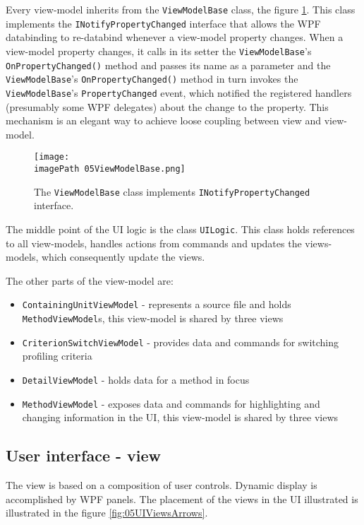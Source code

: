 Every view-model inherits from the \texttt{ViewModelBase} class, the figure \ref{fig:05ViewModelBase}. This class implements the \texttt{INotifyPropertyChanged} interface that allows the WPF databinding to re-databind whenever a view-model property changes. When a view-model property changes, it calls in its setter the \texttt{ViewModelBase}'s \texttt{OnPropertyChanged()} method and passes its name as a parameter and the \texttt{ViewModelBase}'s \texttt{OnPropertyChanged()} method in turn invokes the \texttt{ViewModelBase}'s \texttt{PropertyChanged} event, which notified the registered handlers (presumably some WPF delegates) about the change to the property. This mechanism is an elegant way to achieve loose coupling between view and view-model.
 
 \begin{figure}
	\centering
		\texttt{[image: \\imagePath 05ViewModelBase.png]}
		\caption{The \texttt{ViewModelBase} class implements \texttt{INotifyPropertyChanged} interface.}
	\label{fig:05ViewModelBase}
\end{figure}

The middle point of the UI logic is the class \texttt{UILogic}. This class holds references to all view-models, handles actions from commands and updates the views-models, which consequently update the views.

The other parts of the view-model are:
\begin{itemize}	
\item  \texttt{ContainingUnitViewModel} - represents a source file and holds \texttt{MethodViewModel}s, this view-model is shared by three views	

\item \texttt{CriterionSwitchViewModel} - provides data and commands for switching profiling criteria

\item \texttt{DetailViewModel} - holds data for a method in focus

\item \texttt{MethodViewModel} - exposes data and commands for highlighting and changing information in the UI, this view-model is shared by three views	
\end{itemize}


\subsection{User interface - view}
The view is based on a composition of user controls. Dynamic display is accomplished by WPF panels. The placement of the views in the UI illustrated is illustrated in the figure \ref{fig:05UIViewsArrows}. 

